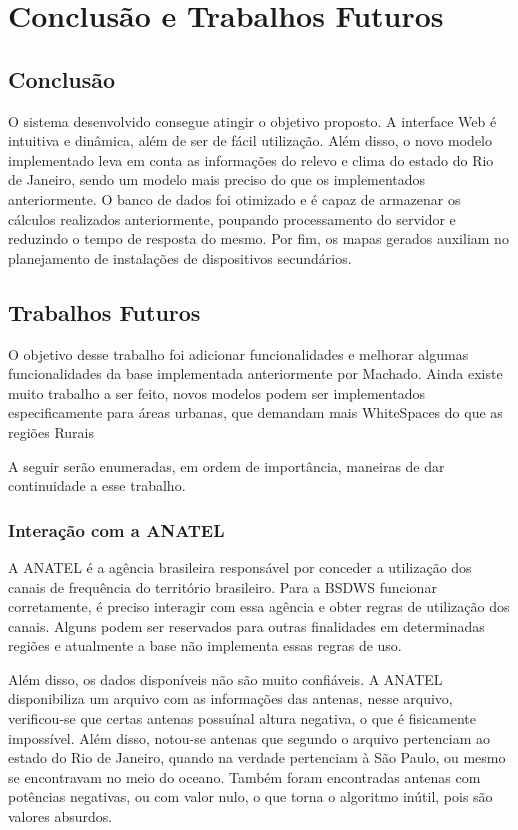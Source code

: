 \chapter{Conclusão e Trabalhos Futuros}

\section{Conclusão}

O sistema desenvolvido consegue atingir o objetivo proposto. A interface Web é intuitiva e dinâmica, além de ser de fácil utilização. Além disso, o novo modelo implementado leva em conta as informações do relevo e clima do estado do Rio de Janeiro, sendo um modelo mais preciso do que os implementados anteriormente. O banco de dados foi otimizado e é capaz de armazenar os cálculos realizados anteriormente, poupando processamento do servidor e reduzindo o tempo de resposta do mesmo. Por fim, os mapas gerados auxiliam no planejamento de instalações de dispositivos secundários.

\section{Trabalhos Futuros}

O objetivo desse trabalho foi adicionar funcionalidades e melhorar algumas funcionalidades da base implementada anteriormente por Machado. Ainda existe muito trabalho a ser feito, novos modelos podem ser implementados especificamente para áreas urbanas, que demandam mais WhiteSpaces do que as regiões Rurais

A seguir serão enumeradas, em ordem de importância, maneiras de dar continuidade a esse trabalho.

\subsection{Interação com a ANATEL}

A ANATEL é a agência brasileira responsável por conceder a utilização dos canais de frequência do território brasileiro. Para a BSDWS funcionar corretamente, é preciso interagir com essa agência e obter regras de utilização dos canais. Alguns podem ser reservados para outras finalidades em determinadas regiões e atualmente a base não implementa essas regras de uso.

Além disso, os dados disponíveis não são muito confiáveis. A ANATEL disponibiliza um arquivo com as informações das antenas, nesse arquivo, verificou-se que certas antenas possuínal altura negativa, o que é fisicamente impossível. Além disso, notou-se antenas que segundo o arquivo pertenciam ao estado do Rio de Janeiro, quando na verdade pertenciam à São Paulo, ou mesmo se encontravam no meio do oceano. Também foram encontradas antenas com potências negativas, ou com valor nulo, o que torna o algoritmo inútil, pois são valores absurdos.

